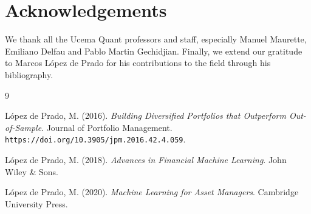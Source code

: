 \documentclass[english]{maciarticle}
\begin{document}
\section*{Acknowledgements}

We thank all the Ucema Quant professors and staff, especially Manuel Maurette, Emiliano Delfau and Pablo Martin Gechidjian. Finally, we extend our gratitude to Marcos López de Prado for his contributions to the field through his bibliography.

\begin{thebibliography}{9}

López de Prado, M. (2016). \textit{Building Diversified Portfolios that Outperform Out-of-Sample}. Journal of Portfolio Management. \texttt{https://doi.org/10.3905/jpm.2016.42.4.059}.

López de Prado, M. (2018). \textit{Advances in Financial Machine Learning}. John Wiley \& Sons.

López de Prado, M. (2020). \textit{Machine Learning for Asset Managers}. Cambridge University Press.

\end{thebibliography}
\end{document}

